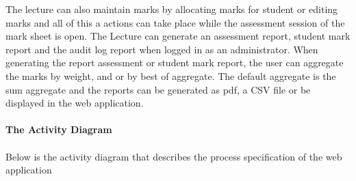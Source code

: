 \documentclass[12pt,a4paper]{article}
\begin{document}
The lecture can also maintain marks by allocating marks for student or editing marks and all of this a actions can take place while the assessment session of the mark sheet is open. The Lecture can generate an assessment report, student mark report and the audit log report when logged in as an administrator. When generating the report assessment or student mark report, the user can aggregate the marks by weight, and or by best of aggregate. The default aggregate is the sum aggregate and the reports can be generated as pdf, a CSV file or be displayed in the web application.\\\\
\textbf{The Activity Diagram}\\\\
Below is the activity diagram that describes the process specification of the web application
\end{document}
